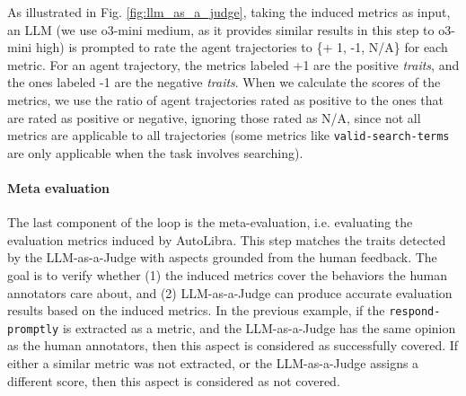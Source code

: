 As illustrated in Fig. \ref{fig:llm_as_a_judge}, taking the induced metrics as
input, an LLM (we use o3-mini medium, as it provides similar results in this step
to o3-mini high) is prompted to rate the agent trajectories to \{+ 1, -1, N/A\} for
each metric. For an agent trajectory, the metrics labeled +1 are the positive
\emph{traits}, and the ones labeled -1 are the negative \emph{traits}. When we calculate
the scores of the metrics, we use the ratio of agent trajectories rated as
positive to the ones that are rated as positive or negative, ignoring those rated
as N/A, since not all metrics are applicable to all trajectories (some metrics like
\texttt{valid-search-terms} are only applicable when the task involves searching).

\paragraph{Meta evaluation}
The last component of the loop is the meta-evaluation, i.e. evaluating the
evaluation metrics induced by AutoLibra. This step matches the traits detected by
the LLM-as-a-Judge with aspects grounded from the human feedback. The goal is to
verify whether (1) the induced metrics cover the behaviors the human annotators
care about, and (2) LLM-as-a-Judge can produce accurate evaluation results based
on the induced metrics. In the previous example, if the \texttt{respond-promptly}
is extracted as a metric, and the LLM-as-a-Judge has the same opinion as the human
annotators, then this aspect is considered as successfully covered. If either a similar
metric was not extracted, or the LLM-as-a-Judge assigns a different score, then this
aspect is considered as not covered.

